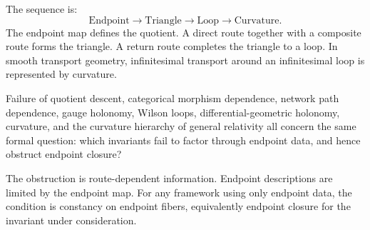 \documentclass[12pt]{article}
\begin{document}
The sequence is:
\[
  \boxed{\text{Endpoint}\longrightarrow\text{Triangle}
  \longrightarrow\text{Loop}\longrightarrow\text{Curvature}.}
\]
The endpoint map defines the quotient. A direct route together with a
composite route forms the triangle. A return route completes the triangle
to a loop. In smooth transport
geometry, infinitesimal transport around an infinitesimal loop is
represented by curvature.

Failure of quotient descent, categorical morphism dependence, network path
dependence, gauge holonomy, Wilson loops, differential-geometric
holonomy, curvature, and the curvature hierarchy of general relativity
all concern the same formal question: which invariants fail to
factor through endpoint data, and hence obstruct endpoint closure?

The obstruction is route-dependent information. Endpoint descriptions
are limited by the endpoint map. For any framework using only endpoint
data, the condition is constancy on endpoint fibers, equivalently endpoint
closure for the invariant under consideration.
\end{document}
